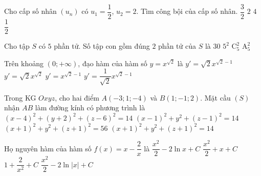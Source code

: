 \begin{ex}%
	Cho cấp số nhân $\left(u_n\right)$ có $u_1=\dfrac{1}{2}$, $u_2=2$. Tìm công bội của cấp số nhân.
	\choice
	{$\dfrac{3}{2}$}
	{$2$}
	{\True $4$}
	{$\dfrac{1}{2}$}
\end{ex}

\begin{ex}%
	Cho tập $S$ có $5$ phần tử. Số tập con gồm đúng $2$ phần tử của $S$ là
	\choice
	{$30$}
	{$5^2$}
	{\True $\mathrm{C}_5^2$}
	{$\mathrm{A}_5^2$}
\end{ex}

\begin{ex}%
	Trên khoảng $(0;+\infty)$, đạo hàm của hàm số $y=x^{\sqrt{2}}$ là
	\choice
	{\True $y'=\sqrt{2}x^{\sqrt{2}-1}$}
	{$y'=\sqrt{2}x^{\sqrt{2}}$}
	{$y'=x^{\sqrt{2}-1}$}
	{$y'=\dfrac{1}{\sqrt{2}}x^{\sqrt{2}-1}$}
\end{ex}

\begin{ex}%
	Trong KG $Oxyz$, cho hai điểm $A\left(-3;1;-4\right)$ và $B\left(1;-1;2\right)$. Mặt cầu $(S)$ nhận $AB$ làm đường kính có phương trình là
	\choice
	{$\left(x-4\right)^2+\left(y+2\right)^2+\left(z-6\right)^2=14$}
	{$\left(x-1\right)^2+y^2+\left(z-1\right)^2=14$}
	{$\left(x+1\right)^2+y^2+\left(z+1\right)^2=56$}
	{\True $\left(x+1\right)^2+y^2+\left(z+1\right)^2=14$}
\end{ex}

\begin{ex}%
	Họ nguyên hàm của hàm số $f(x)=x-\dfrac{2}{x}$ là
	\choice
	{$\dfrac{x^2}{2}-2\ln x+C$}
	{$\dfrac{x^2}{2}+x+C$}
	{$1+\dfrac{2}{x^2}+C$}
	{\True $\dfrac{x^2}{2}-2\ln\left|x\right|+C$}
\end{ex}

